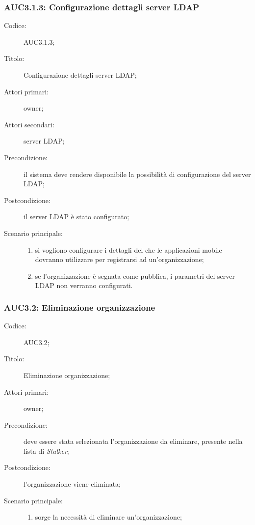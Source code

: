 \documentclass[../../../analisi-dei-requisiti.tex]{subfiles}
\begin{document}
\subsubsection{AUC3.1.3: Configurazione dettagli server LDAP}%
\label{subs:AUC3.1.3}
\begin{description}
  \item[Codice:] AUC3.1.3;
  \item[Titolo:] Configurazione dettagli server LDAP\@;
  \item[Attori primari:] owner;
  \item[Attori secondari:] server LDAP\@;
  \item[Precondizione:] il sistema deve rendere disponibile la possibilità di configurazione del server LDAP\@;
  \item[Postcondizione:] il server LDAP è stato configurato;
  \item[Scenario principale:]
        \begin{enumerate}
          \item si vogliono configurare i dettagli del  che le applicazioni mobile dovranno utilizzare per registrarsi ad un'organizzazione;
          \item se l'organizzazione è segnata come pubblica, i parametri del server LDAP non verranno configurati.
        \end{enumerate}
\end{description}

\subsubsection{AUC3.2: Eliminazione organizzazione}%
\label{subs:AUC3.2}
\begin{description}
  \item[Codice:] AUC3.2;
  \item[Titolo:] Eliminazione organizzazione;
  \item[Attori primari:] owner;
  \item[Precondizione:] deve essere stata selezionata l'organizzazione da eliminare, presente nella lista di \emph{Stalker};
  \item[Postcondizione:] l'organizzazione viene eliminata;
  \item[Scenario principale:]
        \begin{enumerate}
          \item sorge la necessità di eliminare un'organizzazione;
        \end{enumerate}
\end{description}
\end{document}
